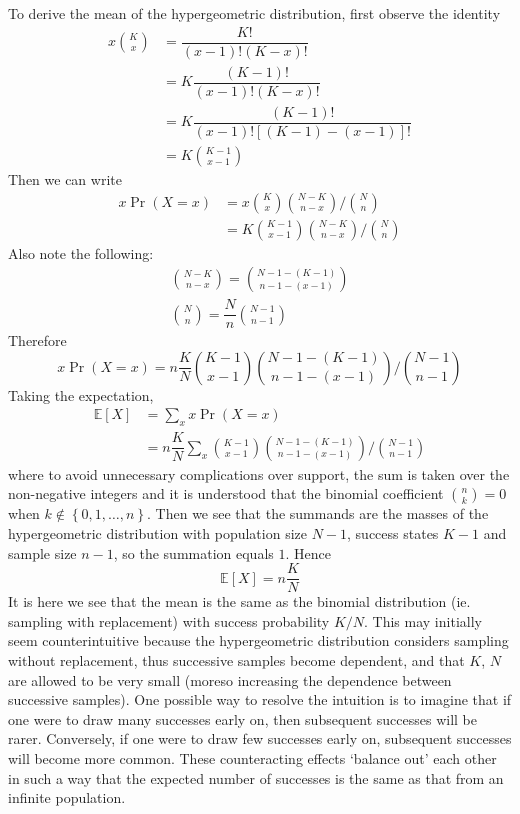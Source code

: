 \documentclass[11pt]{report} %
\begin{document}
To derive the mean of the hypergeometric distribution, first observe the identity
\begin{align}
x\binom{K}{x} &= \dfrac{K!}{\left(x-1\right)!\left(K-x\right)!} \\
&= K\dfrac{\left(K-1\right)!}{\left(x-1\right)!\left(K-x\right)!} \\
&= K\dfrac{\left(K-1\right)!}{\left(x-1\right)!\left[\left(K-1\right)-\left(x-1\right)\right]!} \\
&= K\binom{K - 1}{x - 1}
\end{align}
Then we can write
\begin{align}
x\operatorname{Pr}\left(X=x\right) &= x\binom{K}{x}\binom{N - K}{n - x}/\binom{N}{n} \\
&= K\binom{K - 1}{x - 1}\binom{N - K}{n - x}/\binom{N}{n}
\end{align}
Also note the following:
\begin{gather}
\binom{N - K}{n - x} = \binom{N - 1 - \left(K - 1\right)}{n - 1 - \left(x - 1\right)} \\
\binom{N}{n}=\dfrac{N}{n}\binom{N-1}{n-1}
\end{gather}
Therefore
\begin{equation}
x\operatorname{Pr}\left(X=x\right)=n\dfrac{K}{N}\binom{K - 1}{x - 1}\binom{N - 1 - \left(K - 1\right)}{n - 1 - \left(x - 1\right)}/\binom{N - 1}{n - 1}
\end{equation}
Taking the expectation,
\begin{align}
\mathbb{E}\left[X\right] &= \sum_{x}x\operatorname{Pr}\left(X=x\right) \\
&= n\dfrac{K}{N}\sum_{x}\binom{K - 1}{x - 1}\binom{N - 1 - \left(K - 1\right)}{n - 1 - \left(x - 1\right)}/\binom{N - 1}{n - 1}
\end{align}
where to avoid unnecessary complications over support, the sum is taken over the non-negative integers and it is understood that the binomial coefficient $\binom{n}{k} = 0$ when $k \not\in \left\{0, 1, \dots, n\right\}$. Then we see that the summands are the masses of the hypergeometric distribution with population size $N - 1$, success states $K - 1$ and sample size $n - 1$, so the summation equals $1$. Hence
\begin{equation}
\mathbb{E}\left[X\right]=n\dfrac{K}{N}
\end{equation}
It is here we see that the mean is the same as the binomial distribution (ie. sampling with replacement) with success probability $K/N$. This may initially seem counterintuitive because the hypergeometric distribution considers sampling without replacement, thus successive samples become dependent, and that $K$, $N$ are allowed to be very small (moreso increasing the dependence between successive samples). One possible way to resolve the intuition is to imagine that if one were to draw many successes early on, then subsequent successes will be rarer. Conversely, if one were to draw few successes early on, subsequent successes will become more common. These counteracting effects `balance out' each other in such a way that the expected number of successes is the same as that from an infinite population.
\end{document}
